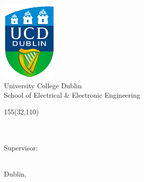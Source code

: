 \begin{titlepage}
\begin{center}
\includegraphics[height=4cm]{Figures/ucd_logo.png} \\
\LARGE
University College Dublin \\
\Large
School of Electrical \& Electronic Engineering \\
\large

\vspace*{10cm}

\setlength{\TPHorizModule}{1mm}
\setlength{\TPVertModule}{\TPHorizModule}

\newlength{\backupparindent}
\setlength{\backupparindent}{\parindent}
\setlength{\parindent}{0mm}

\begin{textblock}{155}(32,110)
    \huge
    \textbf{\doctitle \\}
    \Large
    \authorone \\
    \sauthorone \\
\end{textblock}

\large
Supervisor: \\
\firstCommitteeMember \\

\vfill

\large
Dublin, \monthYear \\

\setlength{\parindent}{\backupparindent}
\end{center}
\end{titlepage} 